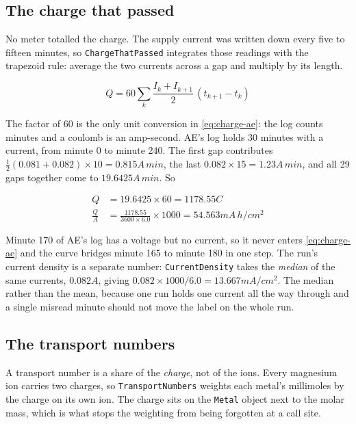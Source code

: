 \subsection{The charge that passed}

No meter totalled the charge. The supply current was written down every five to fifteen
minutes, so \texttt{ChargeThatPassed} integrates those readings with the trapezoid rule:
average the two currents across a gap and multiply by its length.

\begin{equation}\label{eq:charge-ae}
Q = 60 \sum_{k} \frac{I_k + I_{k+1}}{2}\,(t_{k+1} - t_k)
\end{equation}

The factor of 60 is the only unit conversion in \eqref{eq:charge-ae}: the log counts minutes and
a coulomb is an amp-second. AE's log holds 30 minutes with a current, from minute 0 to minute
240. The first gap contributes $\tfrac{1}{2}(0.081 + 0.082) \times 10 = 0.815\unit{A\,min}$,
the last $0.082 \times 15 = 1.23\unit{A\,min}$, and all 29 gaps together come to
$19.6425\unit{A\,min}$. So

\begin{align}
Q &= 19.6425 \times 60 = 1178.55\unit{C} \label{eq:ae-charge} \\
\frac{Q}{A} &= \frac{1178.55}{3600 \times 6.0} \times 1000 = 54.563\unit{mA\,h/cm^2}
   \nonumber
\end{align}

Minute 170 of AE's log has a voltage but no current, so it never enters \eqref{eq:charge-ae} and
the curve bridges minute 165 to minute 180 in one step. The run's current density is a
separate number: \texttt{CurrentDensity} takes the \emph{median} of the same currents,
$0.082\unit{A}$, giving $0.082 \times 1000 / 6.0 = 13.667\unit{mA/cm^2}$. The median rather
than the mean, because one run holds one current all the way through and a single misread
minute should not move the label on the whole run.

\subsection{The transport numbers}

A transport number is a share of the \emph{charge}, not of the ions. Every magnesium ion
carries two charges, so \texttt{TransportNumbers} weights each metal's millimoles by the
charge on its own ion. The charge sits on the \texttt{Metal} object next to the molar mass,
which is what stops the weighting from being forgotten at a call site.

